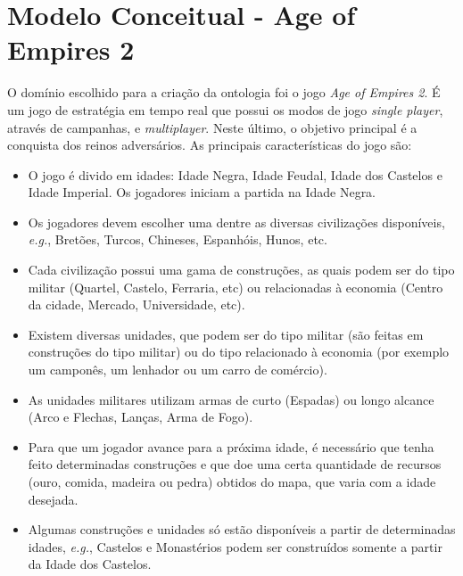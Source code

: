 \documentclass[10pt,a4paper]{article}
\begin{document}

\section{Modelo Conceitual - Age of Empires 2}

O domínio escolhido para a criação da ontologia foi o jogo \emph{Age of Empires 2}. É um jogo de estratégia em tempo real que possui os modos de jogo \emph{single player}, através de campanhas, e \emph{multiplayer}. Neste último, o objetivo principal é a conquista dos reinos adversários. As principais características do jogo são:
%
\begin{itemize}
    \item O jogo é divido em idades: Idade Negra, Idade Feudal, Idade dos Castelos e Idade Imperial. Os jogadores iniciam a partida na Idade Negra.
    \item Os jogadores devem escolher uma dentre as diversas civilizações disponíveis, \emph{e.g.}, Bretões, Turcos, Chineses, Espanhóis, Hunos, etc.
    \item Cada civilização possui uma gama de construções, as quais podem ser do tipo militar (Quartel, Castelo, Ferraria, etc) ou relacionadas à economia (Centro da cidade, Mercado, Universidade, etc).
    \item Existem diversas unidades, que podem ser do tipo militar (são feitas em construções do tipo militar) ou do tipo relacionado à economia (por exemplo um camponês, um lenhador ou um carro de comércio).
    \item As unidades militares utilizam armas de curto (Espadas) ou longo alcance (Arco e Flechas, Lanças, Arma de Fogo).
    \item Para que um jogador avance para a próxima idade, é necessário que tenha feito determinadas construções e que doe uma certa quantidade de recursos (ouro, comida, madeira ou pedra) obtidos do mapa, que varia com a idade desejada.
    \item Algumas construções e unidades só estão disponíveis a partir de determinadas idades, \emph{e.g.}, Castelos e Monastérios podem ser construídos somente a partir da Idade dos Castelos.

\end{itemize}


\end{document}
